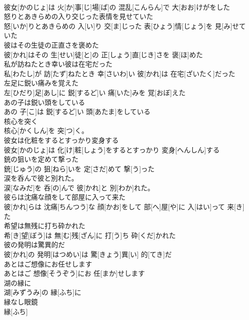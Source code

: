 \documentclass[8pt]{extreport}
\begin{document}
\begin{CJK}{UTF8}{min}
\\	彼女[かのじょ]は 火[か]事[じ]場[ば]の 混乱[こんらん]で 大[おお]けがをした
\\	怒りとあきらめの入り交じった表情を見せていた	
\\	怒[いか]りとあきらめの 入[い]り 交[ま]じった 表[ひょう]情[じょう]を 見[み]せていた
\\	彼はその生徒の正直さを褒めた	
\\	彼[かれ]はその 生[せい]徒[と]の 正[しょう]直[じき]さを 褒[ほ]めた
\\	私が訪ねたとき幸い彼は在宅だった	
\\	私[わたし]が 訪[たず]ねたとき 幸[さいわ]い 彼[かれ]は 在宅[ざいたく]だった
\\	左足に鋭い痛みを覚えた	
\\	左[ひだり]足[あし]に 鋭[するど]い 痛[いた]みを 覚[おぼ]えた
\\	あの子は鋭い頭をしている	
\\	あの 子[こ]は 鋭[するど]い 頭[あたま]をしている
\\	核心を突く	
\\	核心[かくしん]を 突[つ]く。
\\	彼女は化粧をするとすっかり変身する	
\\	彼女[かのじょ]は 化[け]粧[しょう]をするとすっかり 変身[へんしん]する
\\	銃の狙いを定めて撃った	
\\	銃[じゅう]の 狙[ねら]いを 定[さだ]めて 撃[う]った
\\	涙を呑んで彼と別れた。	
\\	涙[なみだ]を 呑[の]んで 彼[かれ]と 別[わか]れた。
\\	彼らは沈痛な顔をして部屋に入って来た	
\\	彼[かれ]らは 沈痛[ちんつう]な 顔[かお]をして 部[へ]屋[や]に 入[はい]って 来[き]た
\\	希望は無残に打ち砕かれた	
\\	希[き]望[ぼう]は 無[む]残[ざん]に 打[う]ち 砕[くだ]かれた
\\	彼の発明は驚異的だ	
\\	彼[かれ]の 発明[はつめい]は 驚[きょう]異[い] 的[てき]だ
\\	あとはご想像にお任せします	
\\	あとはご 想像[そうぞう]にお 任[まか]せします
\\	湖の縁に	
\\	湖[みずうみ]の 縁[ふち]に
\\	縁なし眼鏡	
\\	縁[ふち]

\end{CJK}
\end{document}
